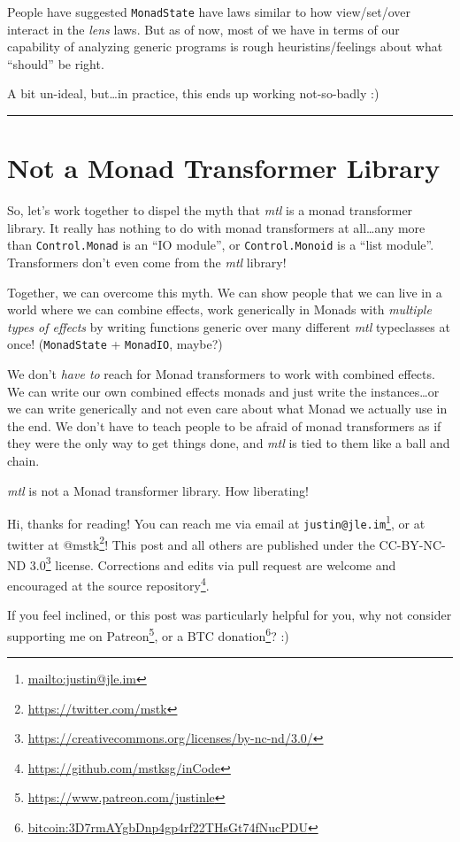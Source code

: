 \documentclass[]{article}
\renewcommand{\href}[2]{#2\footnote{\url{#1}}}
\begin{document}
People have suggested \texttt{MonadState} have laws similar to how view/set/over
interact in the \emph{lens} laws. But as of now, most of we have in terms of our
capability of analyzing generic programs is rough heuristins/feelings about what
``should'' be right.

A bit un-ideal, but\ldots{}in practice, this ends up working not-so-badly :)

\begin{center}\rule{0.5\linewidth}{\linethickness}\end{center}

\hypertarget{not-a-monad-transformer-library}{%
\section{Not a Monad Transformer
Library}\label{not-a-monad-transformer-library}}

So, let's work together to dispel the myth that \emph{mtl} is a monad
transformer library. It really has nothing to do with monad transformers at
all\ldots{}any more than \texttt{Control.Monad} is an ``IO module'', or
\texttt{Control.Monoid} is a ``list module''. Transformers don't even come from
the \emph{mtl} library!

Together, we can overcome this myth. We can show people that we can live in a
world where we can combine effects, work generically in Monads with
\emph{multiple types of effects} by writing functions generic over many
different \emph{mtl} typeclasses at once! (\texttt{MonadState} +
\texttt{MonadIO}, maybe?)

We don't \emph{have to} reach for Monad transformers to work with combined
effects. We can write our own combined effects monads and just write the
instances\ldots{}or we can write generically and not even care about what Monad
we actually use in the end. We don't have to teach people to be afraid of monad
transformers as if they were the only way to get things done, and \emph{mtl} is
tied to them like a ball and chain.

\emph{mtl} is not a Monad transformer library. How liberating!

Hi, thanks for reading! You can reach me via email at
\href{mailto:justin@jle.im}{\nolinkurl{justin@jle.im}}, or at twitter at
\href{https://twitter.com/mstk}{@mstk}! This post and all others are published
under the \href{https://creativecommons.org/licenses/by-nc-nd/3.0/}{CC-BY-NC-ND
3.0} license. Corrections and edits via pull request are welcome and encouraged
at \href{https://github.com/mstksg/inCode}{the source repository}.

If you feel inclined, or this post was particularly helpful for you, why not
consider \href{https://www.patreon.com/justinle}{supporting me on Patreon}, or a
\href{bitcoin:3D7rmAYgbDnp4gp4rf22THsGt74fNucPDU}{BTC donation}? :)
\end{document}
